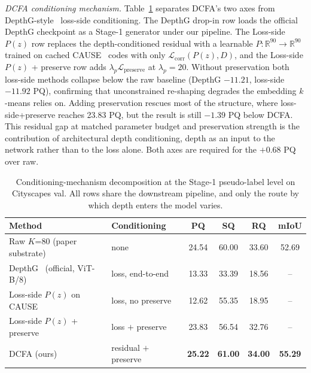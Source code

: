 \documentclass{article}
\renewcommand{\paragraph}[1]{\par\smallskip\noindent\textit{#1}\hspace{0.5em}\ignorespaces}
\begin{document}
\paragraph{DCFA conditioning mechanism.}
Table~\ref{tab:conditioning} separates DCFA's two axes from DepthG-style~\cite{sick2024depthg} loss-side conditioning. The DepthG drop-in row loads the official DepthG checkpoint as a Stage-1 generator under our pipeline. The Loss-side $P(z)$ row replaces the depth-conditioned residual with a learnable $P:\mathbb{R}^{90}\to\mathbb{R}^{90}$ trained on cached CAUSE~\cite{kim2024cause} codes with only $\mathcal{L}_\text{corr}(P(z),D)$, and the Loss-side $P(z)$ + preserve row adds $\lambda_p \mathcal{L}_\text{preserve}$ at $\lambda_p{=}20$. Without preservation both loss-side methods collapse below the raw baseline (DepthG $-11.21$, loss-side $-11.92$ PQ), confirming that unconstrained re-shaping degrades the embedding $k$-means relies on. Adding preservation rescues most of the structure, where loss-side+preserve reaches 23.83 PQ, but the result is still $-1.39$ PQ below DCFA. This residual gap at matched parameter budget and preservation strength is the contribution of architectural depth conditioning, depth as an input to the network rather than to the loss alone. Both axes are required for the $+0.68$ PQ over raw.

\begin{table}[!htbp]
\caption{Conditioning-mechanism decomposition at the Stage-1 pseudo-label level on Cityscapes val. All rows share the downstream pipeline, and only the route by which depth enters the model varies.}
\label{tab:conditioning}
\centering
\scriptsize
\setlength{\tabcolsep}{3pt}
\begin{tabular}{@{}l l c c c c@{}}
\toprule
Method & Conditioning & PQ & SQ & RQ & mIoU \\
\midrule
Raw $K$=80 (paper substrate)        & none                  & 24.54 & 60.00 & 33.60 & 52.69 \\
DepthG~\cite{sick2024depthg} (official, ViT-B/8)          & loss, end-to-end      & 13.33 & 33.39 & 18.56 & -- \\
Loss-side $P(z)$ on CAUSE~\cite{kim2024cause}           & loss, no preserve     & 12.62 & 55.35 & 18.95 & -- \\
Loss-side $P(z)$ + preserve         & loss $+$ preserve     & 23.83 & 56.54 & 32.76 & -- \\
DCFA (ours)                         & residual $+$ preserve & \textbf{25.22} & \textbf{61.00} & \textbf{34.00} & \textbf{55.29} \\
\bottomrule
\end{tabular}
\end{table}
\end{document}
